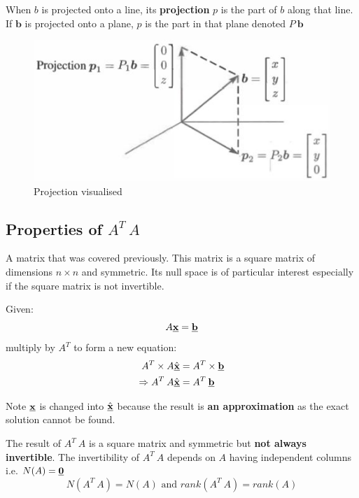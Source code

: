 \documentclass[10pt,a4paper]{article}
\begin{document}
When $b$ is projected onto a line, its \textbf{projection} $p$ is the part of $b$ along that line.
If $\textbf{b}$ is projected onto a plane, $p$ is the part in that plane denoted $P\: \textbf{b}$
\begin{figure} [h!]
	\centering
	\includegraphics[scale=0.8]{Projection.JPG}
	\caption{Projection visualised}
\end{figure}

\subsection{Properties of $A^T\:A$}

A matrix that was covered previously. This matrix is a square matrix of dimensions $n \times n$ and
symmetric. Its null space is of particular interest especially if the square matrix is not invertible.

Given:
$$
	A\textbf{\underbar{x}}=\textbf{\underbar{b}}
$$
multiply by $A^T$ to form a new equation: 
\begin{align*}
	A^T \times A\hat{\textbf{\underbar{x}}} &= A^T \times \textbf{\underbar{b}} \\
	\Rightarrow A^T\: A \hat{\textbf{\underbar{x}}} &= A^T\: \textbf{\underbar{b}}
\end{align*}

Note $\textbf{\underbar{x}}$ is changed into $\hat{\textbf{\underbar{x}}}$ because the result is \textbf{an
approximation} as the exact solution \textbf{} cannot be found. 

\begin{tcolorbox}[breakable,colback=white]
	The result of $A^T\:A$ is a square matrix and symmetric but \textbf{not always invertible}. The
	invertibility of $A^T\:A$ depends on $A$ having independent columns i.e.
	$N(A)=\textbf{\underbar{0}}$
	\begin{equation*} 
	N(A^T\:A)=N(A) \textrm{ and } rank(A^T\:A)=rank(A) 
	\end{equation*}
\end{tcolorbox}
\end{document}
